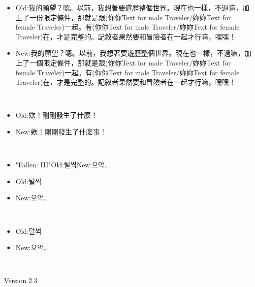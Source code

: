 \documentclass[a4paper,12pt]{article}
\begin{document}
\begin{itemize}
\item Old:我的願望？嗯。以前，我想著要遊歷整個世界。現在也一樣，不過嘛，加上了一份限定條件，那就是跟(‍你你Text for male Traveler/妳妳Text for female Traveler‍)一起。有(‍你你Text for male Traveler/妳妳Text for female Traveler‍)在，才是完整的。記敘者果然要和冒險者在一起才行嘛，嘿嘿！
\item New:我的願望？嗯。以前，我想著要遊歷整個世界。現在也一樣，不過嘛，加上了一個限定條件，那就是跟(‍你你Text for male Traveler/妳妳Text for female Traveler‍)一起。有(‍你你Text for male Traveler/妳妳Text for female Traveler‍)在，才是完整的。記敘者果然要和冒險者在一起才行嘛，嘿嘿！
\end{itemize}\\ \par \vspace{0.5cm}

\begin{itemize}
\item Old:欸！剛剛發生了什麼！
\item New:欸！剛剛發生了什麼事！
\end{itemize}\\ \par \vspace{0.5cm}

\begin{itemize}
\item "Fallen: III"Old:털썩New:으악…
\item Old:털썩
\item New:으악…
\end{itemize}\\ \par \vspace{0.5cm}

\begin{itemize}
\item Old:털썩
\item New:으악…
\end{itemize}\\ \par \vspace{0.5cm}

Version 2.3\\ \par \vspace{0.5cm}
\end{document}
